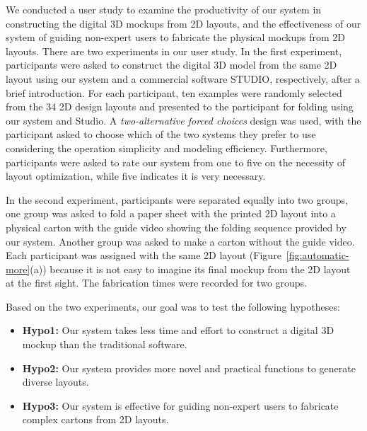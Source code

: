  
We conducted a user study to examine the productivity of our system in constructing the digital 3D mockups from 2D layouts, and the effectiveness of our system of guiding non-expert users to fabricate the physical mockups from 2D layouts. 
%
There are two experiments in our user study.
% 
In the first experiment, participants were asked to construct the digital 3D model from the same 2D layout using our system and a commercial software STUDIO, respectively, after a brief introduction.
For each participant, ten examples were randomly selected from the 34 2D design layouts and presented to the participant for folding using our system and Studio.
A \emph{two-alternative forced choices} design was used, with the participant asked to choose which of the two systems they prefer to use considering the operation simplicity and modeling efficiency. 
%
Furthermore, participants were asked to rate our system from one to five on the necessity of layout optimization, while five indicates it is very necessary.


%
In the second experiment, participants were separated equally into two groups, one group was asked to fold a paper sheet with the printed 2D layout into a physical carton with the guide video showing the folding sequence provided by our system. Another group was asked to make a carton without the guide video. 
Each participant was assigned with the same 2D layout (Figure~\ref{fig:automatic-more}(a)) because it is not easy to imagine its final mockup from the 2D layout at the first sight.
%
The fabrication times were recorded for two groups.
%

Based on the two experiments, our goal was to test the following hypotheses:

\begin{itemize}
	\item \textbf{Hypo1:} Our system takes less time and effort to construct a digital 3D mockup than the traditional software.
	\item \textbf{Hypo2:} Our system provides more novel and practical functions to generate diverse layouts.
	\item \textbf{Hypo3:} Our system is effective for guiding non-expert users to fabricate complex cartons from 2D layouts.
\end{itemize}

